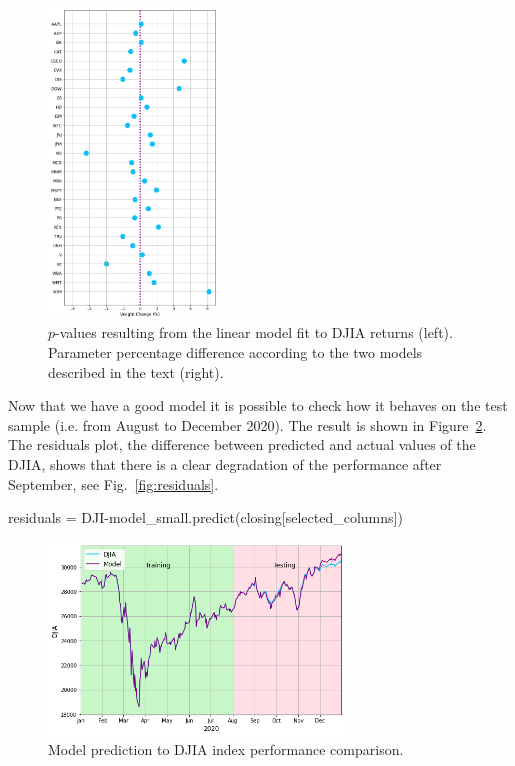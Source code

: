 \begin{solution}
\begin{figure}[htbp]
\includegraphics[width=0.4\textwidth]{figures/delta_weights}
\caption{$p$-values resulting from the linear model fit to DJIA returns (left). Parameter percentage difference according to the two models described in the text (right).}
\label{fig:p-values}
\end{figure}
	
Now that we have a good model it is possible to check how it behaves on the test sample (i.e. from August to December 2020). The result is shown in Figure~\ref{fig:prediction}. The residuals plot, the difference between predicted and actual values of the DJIA, shows that there is a clear degradation of the performance after September, see Fig.~\ref{fig:residuals}.

\begin{ipython}
residuals = DJI-model_small.predict(closing[selected_columns])
\end{ipython}
	
\begin{figure}[htbp]
\centering
\includegraphics[width=0.7\textwidth]{figures/prediction}
\caption{Model prediction to DJIA index performance comparison.}
\label{fig:prediction}
\end{figure}


\end{solution}

